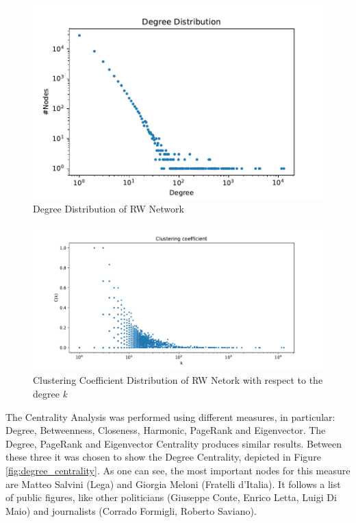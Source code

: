 \documentclass[sigchi]{acmart}
\begin{document}
\begin{figure}[h]
    \centering
    \includegraphics[width=0.9\columnwidth]{report/img/degree_distribution.pdf}
    \caption{Degree Distribution of RW Network}
    \label{fig:degree_RW}
\end{figure}

\begin{figure}[h]
    \centering
    \includegraphics[width=0.9\columnwidth]{report/img/cluster_coefficient_distribution.pdf}
    \caption{Clustering Coefficient Distribution of RW Netork with respect to the degree \textit{k}}
    \label{fig:cc_dis}
\end{figure}


The Centrality Analysis was performed using different measures, in particular: Degree, Betweenness, Closeness, Harmonic, PageRank and Eigenvector. The Degree, PageRank and Eigenvector Centrality produces similar results. Between these three it was chosen to show the Degree Centrality, depicted in Figure \ref{fig:degree_centrality}. As one can see, the most important nodes for this measure are Matteo Salvini (Lega) and Giorgia Meloni (Fratelli d'Italia). It follows a list of public figures, like other politicians (Giuseppe Conte, Enrico Letta, Luigi Di Maio) and journalists (Corrado Formigli, Roberto Saviano).
\end{document}
